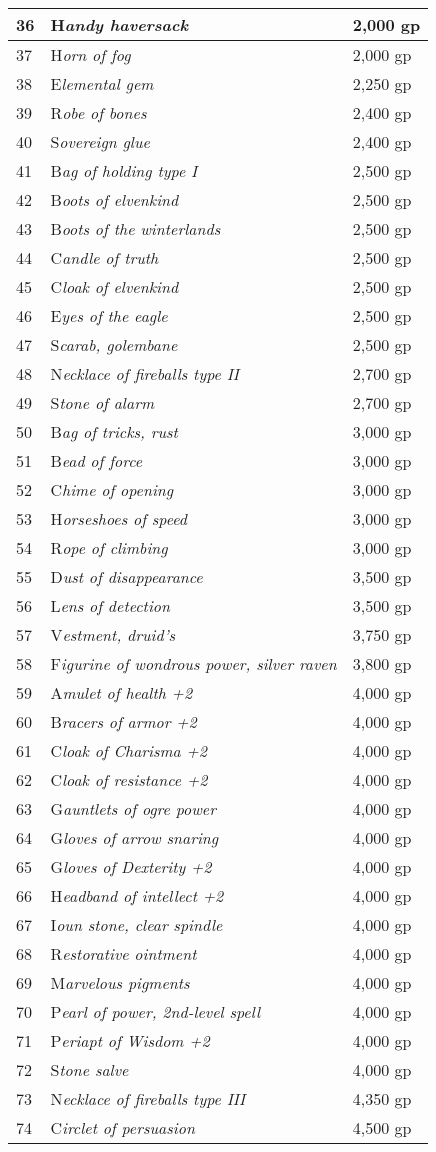 \documentclass{article}
\begin{document}
\begin{tabular}{|>{\raggedright}p{14pt}|>{\raggedright}p{191pt}|>{\raggedright}p{55pt}|}
\hline
36 & H\textit{andy haversack} & 2,000 gp\tabularnewline
\hline
37 & H\textit{orn of fog} & 2,000 gp\tabularnewline
\hline
38 & E\textit{lemental gem} & 2,250 gp\tabularnewline
\hline
39 & R\textit{obe of bones} & 2,400 gp\tabularnewline
\hline
40 & S\textit{overeign glue} & 2,400 gp\tabularnewline
\hline
41 & B\textit{ag of holding type I} & 2,500 gp\tabularnewline
\hline
42 & B\textit{oots of elvenkind} & 2,500 gp\tabularnewline
\hline
43 & B\textit{oots of the winterlands} & 2,500 gp\tabularnewline
\hline
44 & C\textit{andle of truth} & 2,500 gp\tabularnewline
\hline
45 & C\textit{loak of elvenkind} & 2,500 gp\tabularnewline
\hline
46 & E\textit{yes of the eagle} & 2,500 gp\tabularnewline
\hline
47 & S\textit{carab, golembane} & 2,500 gp\tabularnewline
\hline
48 & N\textit{ecklace of fireballs type II} & 2,700 gp\tabularnewline
\hline
49 & S\textit{tone of alarm} & 2,700 gp\tabularnewline
\hline
50 & B\textit{ag of tricks, rust} & 3,000 gp\tabularnewline
\hline
51 & B\textit{ead of force} & 3,000 gp\tabularnewline
\hline
52 & C\textit{hime of opening} & 3,000 gp\tabularnewline
\hline
53 & H\textit{orseshoes of speed} & 3,000 gp\tabularnewline
\hline
54 & R\textit{ope of climbing} & 3,000 gp\tabularnewline
\hline
55 & D\textit{ust of disappearance} & 3,500 gp\tabularnewline
\hline
56 & L\textit{ens of detection} & 3,500 gp\tabularnewline
\hline
57 & V\textit{estment, druid's} & 3,750 gp\tabularnewline
\hline
58 & F\textit{igurine of wondrous power, silver raven} & 3,800 gp\tabularnewline
\hline
59 & A\textit{mulet of health +2} & 4,000 gp\tabularnewline
\hline
60 & B\textit{racers of armor +2} & 4,000 gp\tabularnewline
\hline
61 & C\textit{loak of Charisma +2} & 4,000 gp\tabularnewline
\hline
62 & C\textit{loak of resistance +2} & 4,000 gp\tabularnewline
\hline
63 & G\textit{auntlets of ogre power} & 4,000 gp\tabularnewline
\hline
64 & G\textit{loves of arrow snaring} & 4,000 gp\tabularnewline
\hline
65 & G\textit{loves of Dexterity +2} & 4,000 gp\tabularnewline
\hline
66 & H\textit{eadband of intellect +2} & 4,000 gp\tabularnewline
\hline
67 & I\textit{oun stone, clear spindle} & 4,000 gp\tabularnewline
\hline
68 & R\textit{estorative ointment} & 4,000 gp\tabularnewline
\hline
69 & M\textit{arvelous pigments} & 4,000 gp\tabularnewline
\hline
70 & P\textit{earl of power, 2nd-level spell} & 4,000 gp\tabularnewline
\hline
71 & P\textit{eriapt of Wisdom +2} & 4,000 gp\tabularnewline
\hline
72 & S\textit{tone salve} & 4,000 gp\tabularnewline
\hline
73 & N\textit{ecklace of fireballs type III} & 4,350 gp\tabularnewline
\hline
74 & C\textit{irclet of persuasion} & 4,500 gp\tabularnewline

\end{tabular}
\end{document}
